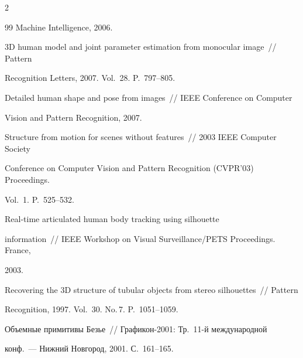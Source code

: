 \begin{multicols}{2}
{{\begin{thebibliography}{99}
Machine Intelligence, 2006.





3D human model and joint parameter estimation from monocular image~// Pattern 

Recognition Letters, 2007. Vol.~28. P.~797--805.





Detailed human shape and pose from images~// IEEE Conference on Computer 

Vision and Pattern Recognition, 2007.

  



Structure from motion for scenes without features~// 2003 IEEE Computer Society 

Conference on Computer Vision and Pattern Recognition (CVPR'03) Proceedings. 

Vol.~1. P.~525--532.




 Real-time articulated human body tracking using silhouette 

information~// IEEE Workshop on Visual Surveillance/PETS Proceedings. France, 

2003.





Recovering the 3D structure of tubular objects from stereo silhouettes~// Pattern 

Recognition, 1997. Vol.~30. No.\,7. P.~1051--1059.





Объемные примитивы Безье~// Графикон-2001: Тр.\ 11-й международной 

конф.~--- Нижний Новгород, 2001. С.~161--165.






\end{thebibliography}}}
\end{multicols}
